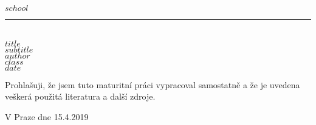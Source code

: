 \begin{titlepage}
    \begin{center}
        \vspace*{1cm}
        \textbf{\large $school$}\\
        \vspace{0.2cm}
        \rule{\textwidth}{0.5pt}\\
        \vspace{5cm}
        \textbf{\Huge $title$}\\
        \vspace{5cm}
        \textbf{\large $subtitle$}\\
        \vspace{2cm}
        \textbf{\large $author$}\\
        \textbf{$class$}\\
        \vspace*{\fill}
        \textbf{\large $date$}\\
    \end{center}
\end{titlepage}
\newpage
\vspace*{5cm}
Prohlašuji, že jsem tuto maturitní práci vypracoval samostatně a že je uvedena veškerá použitá literatura a další zdroje.\newline
\begin{minipage}{0.7\textwidth}
    \vspace{1cm}
    V Praze dne 15.4.2019
\end{minipage}
\begin{minipage}{0.3\textwidth}
    \vspace{1cm}
    \begin{flushright}
        \vspace{11pt}
        \hrulefill
    \end{flushright}
\end{minipage}
